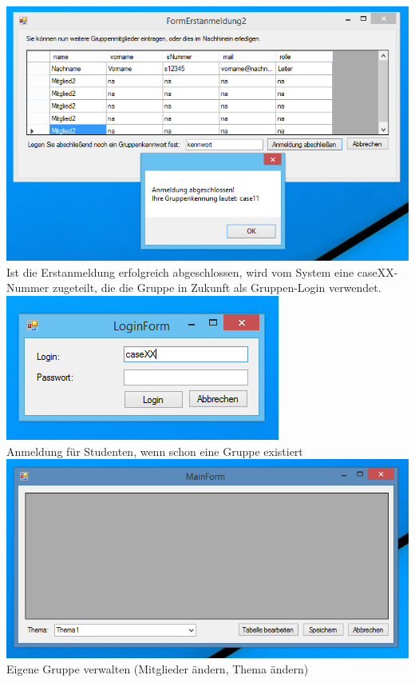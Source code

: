 \documentclass{article}
\begin{document}
\begin{center}
    \includegraphics[scale=0.8]{bilder/pic7.PNG}\\
    Ist die Erstanmeldung erfolgreich abgeschlossen, wird vom System eine caseXX-Nummer zugeteilt, die die Gruppe in Zukunft als Gruppen-Login verwendet. \\
    
    \includegraphics{bilder/pic2.PNG}\\
    Anmeldung für Studenten, wenn schon eine Gruppe existiert \\
    
    \includegraphics[scale=0.8]{bilder/pic8.PNG}\\
    Eigene Gruppe verwalten (Mitglieder ändern, Thema ändern) \\
\end{center}
\end{document}
